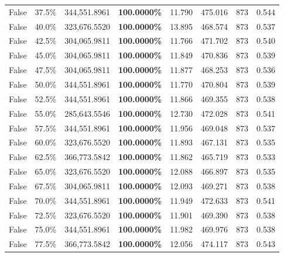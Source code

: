 \begin{table}[H]
{\begin{tabular}{lllrllll}
\cline{1-8}
False & 37.5\% & 344,551.8961 & \bfseries \color{red} 100.0000\% & 11.790 & 475.016 & 873 & 0.544 \\
\cline{1-8}
False & 40.0\% & 323,676.5520 & \bfseries \color{red} 100.0000\% & 13.895 & 468.574 & 873 & 0.537 \\
\cline{1-8}
False & 42.5\% & 304,065.9811 & \bfseries \color{red} 100.0000\% & 11.766 & 471.702 & 873 & 0.540 \\
\cline{1-8}
False & 45.0\% & 304,065.9811 & \bfseries \color{red} 100.0000\% & 11.849 & 470.836 & 873 & 0.539 \\
\cline{1-8}
False & 47.5\% & 304,065.9811 & \bfseries \color{red} 100.0000\% & 11.877 & 468.253 & 873 & 0.536 \\
\cline{1-8}
False & 50.0\% & 344,551.8961 & \bfseries \color{red} 100.0000\% & 11.770 & 470.804 & 873 & 0.539 \\
\cline{1-8}
False & 52.5\% & 344,551.8961 & \bfseries \color{red} 100.0000\% & 11.866 & 469.355 & 873 & 0.538 \\
\cline{1-8}
False & 55.0\% & 285,643.5546 & \bfseries \color{red} 100.0000\% & 12.730 & 472.028 & 873 & 0.541 \\
\cline{1-8}
False & 57.5\% & 344,551.8961 & \bfseries \color{red} 100.0000\% & 11.956 & 469.048 & 873 & 0.537 \\
\cline{1-8}
False & 60.0\% & 323,676.5520 & \bfseries \color{red} 100.0000\% & 11.893 & 467.131 & 873 & 0.535 \\
\cline{1-8}
False & 62.5\% & 366,773.5842 & \bfseries \color{red} 100.0000\% & 11.862 & 465.719 & 873 & 0.533 \\
\cline{1-8}
False & 65.0\% & 323,676.5520 & \bfseries \color{red} 100.0000\% & 12.088 & 466.897 & 873 & 0.535 \\
\cline{1-8}
False & 67.5\% & 304,065.9811 & \bfseries \color{red} 100.0000\% & 12.093 & 469.271 & 873 & 0.538 \\
\cline{1-8}
False & 70.0\% & 344,551.8961 & \bfseries \color{red} 100.0000\% & 11.949 & 472.633 & 873 & 0.541 \\
\cline{1-8}
False & 72.5\% & 323,676.5520 & \bfseries \color{red} 100.0000\% & 11.901 & 469.390 & 873 & 0.538 \\
\cline{1-8}
False & 75.0\% & 344,551.8961 & \bfseries \color{red} 100.0000\% & 11.982 & 469.976 & 873 & 0.538 \\
\cline{1-8}
False & 77.5\% & 366,773.5842 & \bfseries \color{red} 100.0000\% & 12.056 & 474.117 & 873 & 0.543 \\

\end{tabular}}
\end{table}
